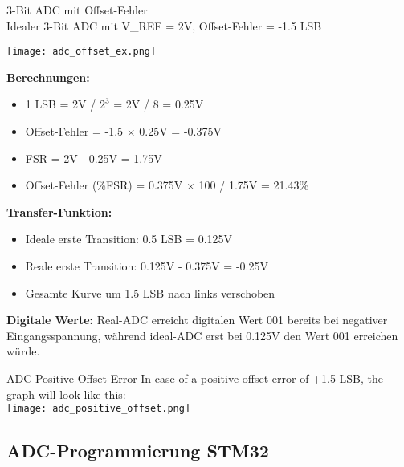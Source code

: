 \begin{example2}{3-Bit ADC mit Offset-Fehler}\\
    Idealer 3-Bit ADC mit V\_REF = 2V, Offset-Fehler = -1.5 LSB
    
    \tcblower

    \texttt{[image: adc\_offset\_ex.png]}
    
    \textbf{Berechnungen:}
    \begin{itemize}
        \item 1 LSB = 2V / $2^3$ = 2V / 8 = 0.25V
        \item Offset-Fehler = -1.5 $\times$ 0.25V = -0.375V
        \item FSR = 2V - 0.25V = 1.75V
        \item Offset-Fehler (\%FSR) = 0.375V $\times$ 100 / 1.75V = 21.43\%
    \end{itemize}
    
    \textbf{Transfer-Funktion:}
    \begin{itemize}
        \item Ideale erste Transition: 0.5 LSB = 0.125V
        \item Reale erste Transition: 0.125V - 0.375V = -0.25V
        \item Gesamte Kurve um 1.5 LSB nach links verschoben
    \end{itemize}
    
    \textbf{Digitale Werte:}
    Real-ADC erreicht digitalen Wert 001 bereits bei negativer Eingangsspannung, während ideal-ADC erst bei 0.125V den Wert 001 erreichen würde.
\end{example2}

\begin{example2}{ADC Positive Offset Error} In case of a positive offset error of +1.5 LSB, the graph will look like this:\\
\texttt{[image: adc\_positive\_offset.png]}
\end{example2}

\subsection{ADC-Programmierung STM32}

